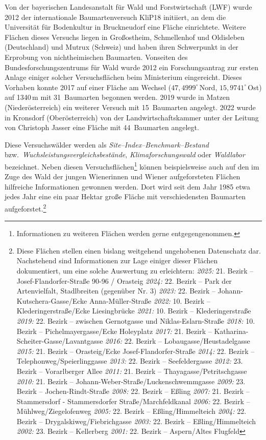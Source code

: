 \documentclass[twocolumn]{scrartcl}
\begin{document}
Von der bayerischen Landesanstalt für Wald
und Forstwirtschaft (LWF) wurde 2012 der internationale Baumartenversuch KliP18
initiiert, an dem die Universität für Bodenkultur in Bruckneudorf eine Fläche
einrichtete. Weitere Flächen dieses Versuchs liegen in Großostheim, Schmellenhof
und Oldisleben (Deutschland) und Mutrux (Schweiz) und haben ihren Schwerpunkt in
der Erprobung von nichtheimischen Baumarten. Vonseiten des
Bundesforschungszentrums für Wald wurde 2012 ein Forschungsantrag zur ersten
Anlage einiger solcher Versuchsflächen beim Ministerium eingereicht. Dieses
Vorhaben konnte 2017 auf einer Fläche am Wechsel ($47,4999^{\circ}$\,Nord,
$15,9741^{\circ}$\,Ost) auf 1340\,m mit 31~Baumarten begonnen werden. 2019 wurde
in Matzen (Niederösterreich) ein weiterer Versuch mit 15~Baumarten angelegt.
2022 wurde in Kronsdorf (Oberösterreich) von der Landwirtschaftskammer unter der
Leitung von Christoph Jasser eine Fläche mit 44~Baumarten angelegt.

Diese
Versuchswälder werden als \emph{Site--Index--Benchmark--Bestand} bzw.\
\emph{Wuchsleistungsvergleichsbestände}, \emph{Klimaforschungswald} oder
\emph{Waldlabor} bezeichnet. Neben diesen Versuchsflächen\footnote{Informationen
zu weiteren Flächen werden gerne entgegengenommen.} können beispielsweise auch
auf den im Zuge des \glqq{}Wald der jungen Wienerinnen und Wiener\grqq{}
aufgeforsteten Flächen hilfreiche Informationen gewonnen werden. Dort wird seit
dem Jahr 1985 etwa jedes Jahr eine ein paar Hektar große Fläche mit
verschiedensten Baumarten aufgeforstet.\footnote{Diese Flächen stellen einen bislang weitgehend ungehobenen Datenschatz dar. Nachstehend sind Informationen zur Lage einiger dieser Flächen dokumentiert, um eine solche Auswertung zu erleichtern:
\emph{2025:} 21. Bezirk -- Josef-Flandorfer-Straße 90-96 / Orasteig
\emph{2024:} 22. Bezirk -- Park der Artenvielfalt, Stadlbreiten (gegenüber Nr. 3)
\emph{2023:} 22. Bezirk -- Johann-Kutschera-Gasse/Ecke Anna-Müller-Straße
\emph{2022:} 10. Bezirk -- Klederingerstraße/Ecke Liesingbrücke
\emph{2021:} 10. Bezirk -- Klederingerstraße
\emph{2019:} 22. Bezirk -- zwischen Gernotgasse und Niklas-Eslarn-Straße
\emph{2018:} 10. Bezirk -- Pichelmayergasse/Ecke Holeyplatz
\emph{2017:} 21. Bezirk -- Katharina-Scheiter-Gasse/Lavantgasse
\emph{2016:} 22. Bezirk -- Lobaugasse/Heustadelgasse
\emph{2015:} 21. Bezirk -- Orasteig/Ecke Josef-Flandorfer-Straße
\emph{2014:} 22. Bezirk -- Telephonweg/Speierlinggasse
\emph{2013:} 22. Bezirk -- Seefeldergasse
\emph{2012:} 23. Bezirk -- Vorarlberger Allee
\emph{2011:} 21. Bezirk -- Thayagasse/Petritschgasse
\emph{2010:} 21. Bezirk -- Johann-Weber-Straße/Luckenschwemmgasse
\emph{2009:} 23. Bezirk -- Jochen-Rindt-Straße
\emph{2008:} 22. Bezirk -- Eßling
\emph{2007:} 21. Bezirk -- Stammersdorf - Stammersdorfer Straße/Marchfeldkanal
\emph{2006:} 22. Bezirk -- Mühlweg/Ziegelofenweg
\emph{2005:} 22. Bezirk -- Eßling/Himmelteich
\emph{2004:} 22. Bezirk -- Drygalskiweg/Fiebrichgasse
\emph{2003:} 22. Bezirk -- Eßling/Himmelteich
\emph{2002:} 23. Bezirk -- Kellerberg
\emph{2001:} 22. Bezirk -- Aspern/Altes Flugfeld}
\end{document}
